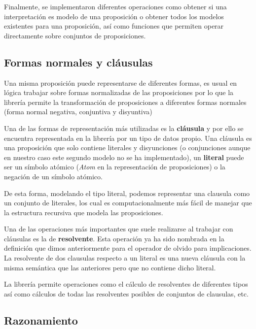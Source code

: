 	Finalmente, se implementaron diferentes operaciones como obtener si una interpretación es modelo de una proposición o obtener todos los modelos existentes para una proposición, así como funciones que permiten operar directamente sobre conjuntos de proposiciones.
	
	
	
\subsection*{Formas normales y cláusulas}

	Una misma proposición puede representarse de diferentes formas, es usual en lógica trabajar sobre formas normalizadas de las proposiciones por lo que la librería permite la transformación de proposiciones a diferentes formas normales (forma normal negativa, conjuntiva y disyuntiva)	
	
	Una de las formas de representación más utilizadas es la \textbf{cláusula} y por ello se encuentra representada en la librería por un tipo de datos propio. Una cláusula es una proposición que solo contiene literales y disyunciones (o conjunciones aunque en nuestro caso este segundo modelo no se ha implementado), un \textbf{literal} puede ser un símbolo atómico (\textit{Atom} en la representación de proposiciones) o la negación de un símbolo atómico.
	
	De esta forma, modelando el tipo literal, podemos representar una clausula como un conjunto de literales, los cual es computacionalmente más fácil de manejar que la estructura recursiva que modela las proposiciones.
	
	Una de las operaciones más importantes que suele realizarse al trabajar con cláusulas es la de \textbf{resolvente}. Esta operación ya ha sido nombrada en la definición que dimos anteriormente para el operador de olvido para implicaciones. La resolvente de dos clausulas respecto a un literal es una nueva cláusula con la misma semántica que las anteriores pero que no contiene dicho literal. 
	
	La librería permite operaciones como el cálculo de resolventes de diferentes tipos así como cálculos de todas las resolventes posibles de conjuntos de clausulas, etc.
	

\subsection*{Razonamiento}

